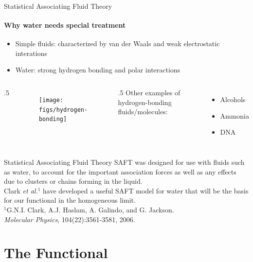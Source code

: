 \documentclass{beamer}
\begin{document}
\begin{frame}{Statistical Associating Fluid Theory}
\framesubtitle{Why water needs special treatment}
 \begin{itemize}
  \item <1-> Simple fluids: characterized by van der Waals and weak electrostatic interations
  \item <2-> Water: strong hydrogen bonding and polar interactions
 \end{itemize}
\begin{columns}
  {.5\textwidth}
\begin{figure}
 \texttt{[image: figs/hydrogen-bonding]}
\end{figure}
 {.5\textwidth}
Other examples of hydrogen-bonding fluids/molecules:\\
\begin{itemize}
 \item <4-> Alcohols
 \item <4-> Ammonia
 \item <4-> DNA
\end{itemize}
\end{columns}
\end{frame}

\begin{frame}{Statistical Associating Fluid Theory}
\vspace{0.7cm}
SAFT was designed for
use with fluids such as water, to account for the important association forces
as well as any effects due to clusters or chains forming
in the liquid.\\
\vspace{0.7cm}
\pause
Clark \emph{et al.}$^1$ have developed
a useful SAFT model for water that will be the basis for our functional in the
homogeneous limit.\\
\vspace{2cm}
\scriptsize{$^1$G.N.I. Clark, A.J. Haslam, A. Galindo, and 
G. Jackson.\\ \emph{Molecular Physics}, 104(22):3561-3581, 2006.}
\end{frame}

\section{The Functional}
\subsection*{}
\end{document}
